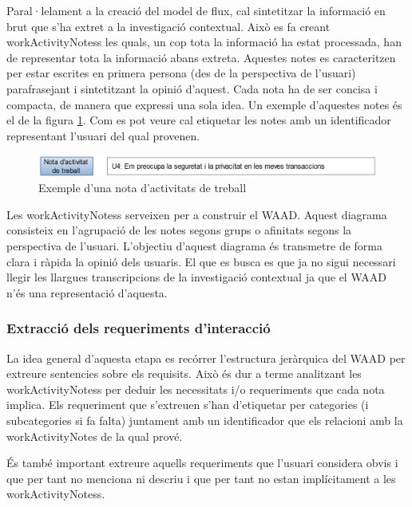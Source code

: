 Paral·lelament a la creació del model de flux, cal sintetitzar la informació en brut que s'ha extret a la investigació contextual. Això es fa creant \glspl{workActivityNotes} les quals, un cop tota la informació ha estat processada, han de representar tota la informació abans extreta. Aquestes notes es caracteritzen per estar escrites en primera persona (des de la perspectiva de l'usuari) parafrasejant i sintetitzant la opinió d'aquest. Cada nota ha de ser concisa i compacta, de manera que expressi una sola idea. Un exemple d'aquestes notes és el de la figura \ref{fig:workActivityNote1}. Com es pot veure cal etiquetar les notes amb un identificador representant l'usuari del qual provenen.

\begin{figure}[htp]
\centering
\includegraphics[scale=0.3]{WorkActivityNotes1.png}
\caption{Exemple d'una nota d'activitats de treball}\label{fig:workActivityNote1}
\end{figure}

Les \glspl{workActivityNotes} serveixen per a construir el \ac{WAAD}. Aquest diagrama consisteix en l'agrupació de les notes segons grups o afinitats segons la perspectiva de l'usuari. L'objectiu d'aquest diagrama és transmetre de forma clara i ràpida la opinió dels usuaris. El que es busca es que ja no sigui necessari llegir les llargues transcripcions de la investigació contextual ja que el \ac{WAAD} n'és una representació d'aquesta. 


\subsubsection{Extracció dels requeriments d'interacció}
La idea general d'aquesta etapa es recórrer l'estructura jeràrquica del \ac{WAAD} per extreure sentencies sobre els requisits. Això és dur a terme analitzant les \glspl{workActivityNotes} per deduir les necessitats i/o requeriments que cada nota implica. Els requeriment que s'extreuen s'han d'etiquetar per categories (i subcategories si fa falta) juntament amb un identificador que els relacioni amb la \gls{workActivityNotes} de la qual prové. 

És també important extreure aquells requeriments que l'usuari considera obvis i que per tant no menciona ni descriu i que per tant no estan implícitament a les \glspl{workActivityNotes}.


